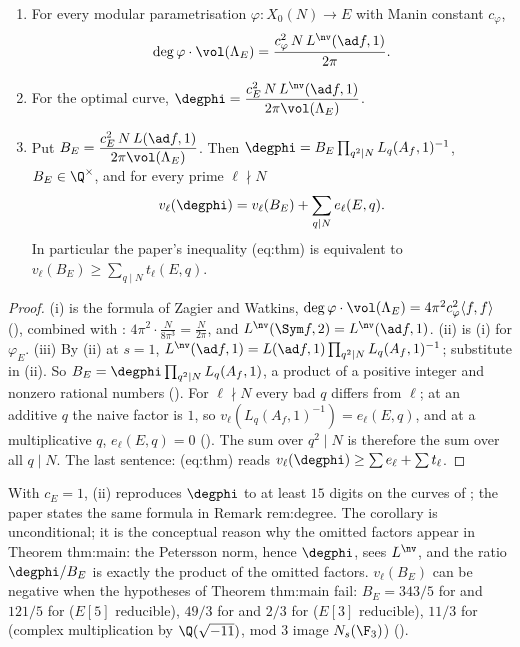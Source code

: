\begin{corollary}\label{cor:lfunctions:degree-formula}
\begin{enumerate}[label=(\roman*)]
\item For every modular parametrisation $\varphi\colon X_0(N)\to E$ with Manin constant $c_\varphi$,
\[
\deg\varphi\cdot\vol(\Lambda_E)=\frac{c_\varphi^2\,N\,L^{\nv}(\ad f,1)}{2\pi}.
\]
\item For the optimal curve, $\degphi=\dfrac{c_E^2\,N\,L^{\nv}(\ad f,1)}{2\pi\vol(\Lambda_E)}$.
\item Put $B_E=\dfrac{c_E^2\,N\,L(\ad f,1)}{2\pi\vol(\Lambda_E)}$. Then $\degphi=B_E\prod_{q^2\mid N}L_q(A_f,1)^{-1}$, $B_E\in\Q^\times$, and for every prime $\ell\nmid N$
\[
v_\ell(\degphi)=v_\ell(B_E)+\sum_{q\mid N}e_\ell(E,q).
\]
In particular the paper's inequality (eq:thm) is equivalent to $v_\ell(B_E)\ge\sum_{q\mid N}t_\ell(E,q)$.
\end{enumerate}
\end{corollary}

\begin{proof}
(i) is the formula of Zagier and Watkins, $\deg\varphi\cdot\vol(\Lambda_E)=4\pi^2c_\varphi^2\langle f,f\rangle$ (), combined with :
$4\pi^2\cdot\frac N{8\pi^3}=\frac N{2\pi}$, and $L^{\nv}(\Sym f,2)=L^{\nv}(\ad f,1)$. (ii) is (i) for $\varphi_E$. (iii) By (ii) at $s=1$,
$L^{\nv}(\ad f,1)=L(\ad f,1)\prod_{q^2\mid N}L_q(A_f,1)^{-1}$; substitute in (ii). So $B_E=\degphi\prod_{q^2\mid N}L_q(A_f,1)$, a product of a positive integer and nonzero rational
numbers (). For $\ell\nmid N$ every bad $q$ differs from $\ell$; at an additive $q$ the naive factor is $1$, so
$v_\ell(L_q(A_f,1)^{-1})=e_\ell(E,q)$, and at a multiplicative $q$, $e_\ell(E,q)=0$ (). The sum over $q^2\mid N$ is therefore the sum over all $q\mid N$.
The last sentence: (eq:thm) reads $v_\ell(\degphi)\ge\sum e_\ell+\sum t_\ell$.
\end{proof}

With $c_E=1$, (ii) reproduces $\degphi$ to at least $15$ digits on the curves of ; the paper states the
same formula in Remark rem:degree. The corollary is unconditional; it is the conceptual reason why the omitted factors appear in Theorem thm:main: the
Petersson norm, hence $\degphi$, sees $L^{\nv}$, and the ratio $\degphi/B_E$ is exactly the product of the omitted factors. $v_\ell(B_E)$ can be negative when the
hypotheses of Theorem thm:main fail: $B_E=343/5$ for  and $121/5$ for  ($E[5]$ reducible), $49/3$ for  and $2/3$ for 
($E[3]$ reducible), $11/3$ for  (complex multiplication by $\Q(\sqrt{-11})$, mod $3$ image $N_s(\F_3)$) ().

